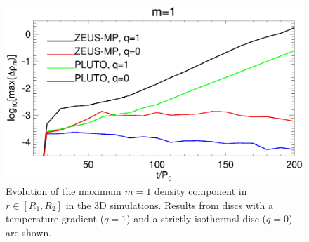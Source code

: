 
\begin{figure}
  \includegraphics[width=\linewidth]{figures/m1_analysis_plot_ampmax3d}
  \caption{Evolution of the maximum $m=1$ density component in  $r\in[R_1,R_2]$
    in the 3D simulations. Results from discs with a 
    temperature gradient ($q=1$) and a strictly isothermal disc
    ($q=0$) are shown.  
    \label{3d_ampmax}}   
\end{figure}


